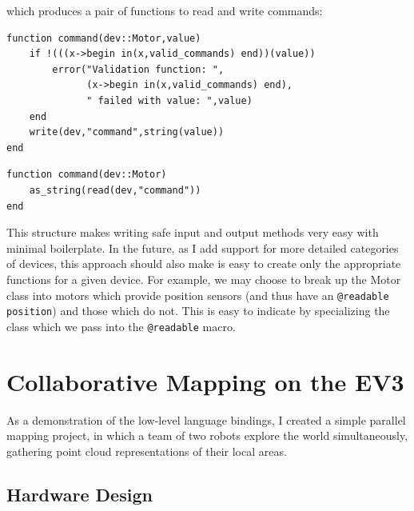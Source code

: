 \documentclass[]{article}
\begin{document}
which produces a pair of functions to read and write commands:

\begin{verbatim}
function command(dev::Motor,value)
    if !(((x->begin in(x,valid_commands) end))(value))
        error("Validation function: ",
              (x->begin in(x,valid_commands) end),
              " failed with value: ",value)
    end 
    write(dev,"command",string(value))
end 
\end{verbatim}
\begin{verbatim}
function command(dev::Motor)
    as_string(read(dev,"command"))
end
\end{verbatim}

This structure makes writing safe input and output methods very easy with minimal boilerplate. In the future, as I add support for more detailed categories of devices, this approach should also make is easy to create only the appropriate functions for a given device. For example, we may choose to break up the Motor class into motors which provide position sensors (and thus have an \texttt{@readable position}) and those which do not. This is easy to indicate by specializing the class which we pass into the \texttt{@readable} macro. 

\section{Collaborative Mapping on the EV3}

As a demonstration of the low-level language bindings, I created a simple parallel mapping project, in which a team of two robots explore the world simultaneously, gathering point cloud representations of their local areas. 

\subsection{Hardware Design}
\end{document}
